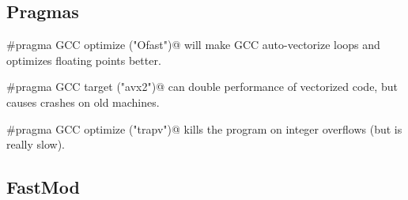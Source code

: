 	\subsection{Pragmas}
		\verb@#pragma GCC optimize ("Ofast")@ will make GCC auto-vectorize loops and optimizes floating points better.
		
		\verb@#pragma GCC target ("avx2")@ can double performance of vectorized code, but causes crashes on old machines.
		
		\verb@#pragma GCC optimize ("trapv")@ kills the program on integer overflows (but is really slow).
	\subsection{FastMod}
